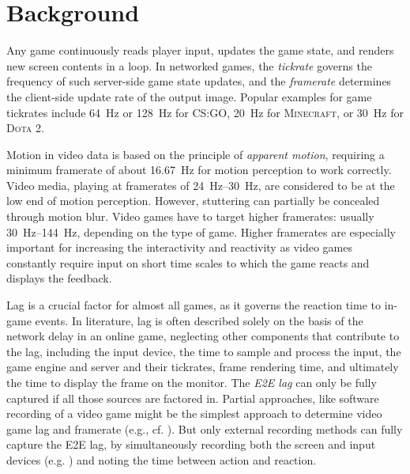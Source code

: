 \section{Background}
\label{sec:background}

Any game continuously reads player input, updates the game state, and renders new screen contents in a loop. In networked games, the \textit{tickrate} governs the frequency of such server-side game state updates, and the \textit{framerate} determines the client-side update rate of the output image. Popular examples for game tickrates include \SI{64}{\hertz} or \SI{128}{\hertz} for \textsc{CS:GO}, \SI{20}{\hertz} for \textsc{Minecraft}, or \SI{30}{\hertz} for \textsc{Dota 2}.

Motion in video data is based on the principle of \textit{apparent motion}, requiring a minimum framerate of about \SI{16.67}{\hertz} for motion perception to work correctly. Video media, playing at framerates of \SIrange{24}{30}{\hertz}, are considered to be at the low end of motion perception. However, stuttering can partially be concealed through motion blur. Video games have to target higher framerates: usually \SIrange{30}{144}{\hertz}, depending on the type of game. Higher framerates are especially important for increasing the interactivity and reactivity as video games constantly require input on short time scales to which the game reacts and displays the feedback.

Lag is a crucial factor for almost all games, as it governs the reaction time to in-game events. In literature, lag is often described solely on the basis of the network delay in an online game, neglecting other components that contribute to the lag, including the input device, the time to sample and process the input, the game engine and server and their tickrates, frame rendering time, and ultimately the time to display the frame on the monitor. The \textit{\gls{E2E} lag} can only be fully captured if all those sources are factored in. Partial approaches, like software recording of a video game might be the simplest approach to determine video game lag and framerate (e.g., cf. \cite{Chen:2011:MLC:2072298.2071991}). 
But only external recording methods can fully capture the \gls{E2E} lag, by simultaneously recording both the screen and input devices (e.g. \cite{beyermethod}) and noting the time between action and reaction.
